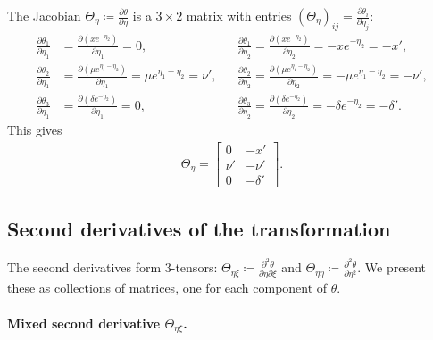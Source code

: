 \documentclass{article}
\begin{document}
The Jacobian $\Theta_\eta \coloneqq \frac{\partial \theta}{\partial \eta}$ is a $3 \times 2$ matrix with entries $(\Theta_\eta)_{ij} = \frac{\partial \theta_i}{\partial \eta_j}$:
%
\begin{align}
  \frac{\partial \theta_1}{\partial \eta_1} & = \frac{\partial (x e^{-\eta_2})}{\partial \eta_1} = 0,                                        &  & \frac{\partial \theta_1}{\partial \eta_2} = \frac{\partial (x e^{-\eta_2})}{\partial \eta_2} = -x e^{-\eta_2} = -x',                       \\
  \frac{\partial \theta_2}{\partial \eta_1} & = \frac{\partial (\mu e^{\eta_1 - \eta_2})}{\partial \eta_1} = \mu e^{\eta_1 - \eta_2} = \nu', &  & \frac{\partial \theta_2}{\partial \eta_2} = \frac{\partial (\mu e^{\eta_1 - \eta_2})}{\partial \eta_2} = -\mu e^{\eta_1 - \eta_2} = -\nu', \\
  \frac{\partial \theta_3}{\partial \eta_1} & = \frac{\partial (\delta e^{-\eta_2})}{\partial \eta_1} = 0,                                   &  & \frac{\partial \theta_3}{\partial \eta_2} = \frac{\partial (\delta e^{-\eta_2})}{\partial \eta_2} = -\delta e^{-\eta_2} = -\delta'.
\end{align}
%
This gives
%
\begin{align}\label{eq:Theta-eta}
  \Theta_{\eta} =
  \begin{bmatrix}
    0    & -x'      \\
    \nu' & -\nu'    \\
    0    & -\delta'
  \end{bmatrix}.
\end{align}

\subsection{Second derivatives of the transformation}

The second derivatives form 3-tensors: $\Theta_{\eta\xi} \coloneqq \frac{\partial^2 \theta}{\partial \eta \partial \xi}$ and $\Theta_{\eta\eta} \coloneqq \frac{\partial^2 \theta}{\partial \eta^2}$.
We present these as collections of matrices, one for each component of $\theta$.

\paragraph{Mixed second derivative $\Theta_{\eta\xi}$.}
\end{document}
